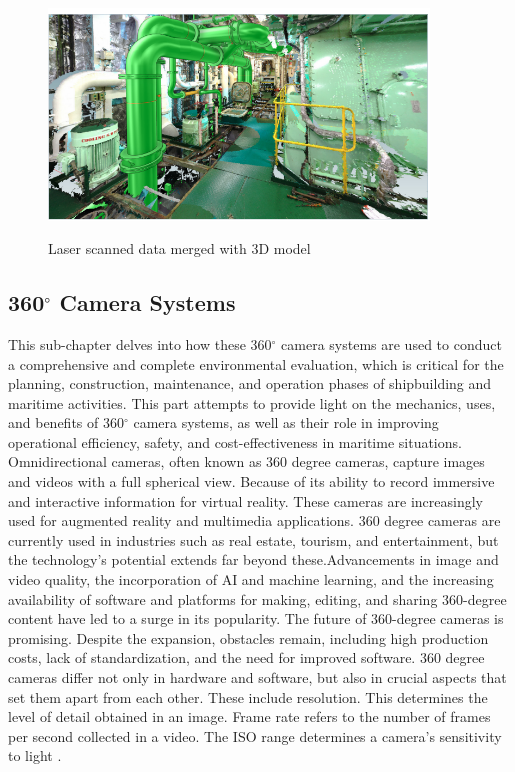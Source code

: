 \begin{figure}[H]
  \centering
  \includegraphics[width=0.9\textwidth]{Figures/AVEVAE3D.PNG}
  \caption[laser data integrated with 3D CAD model in AVEVA E3D software]{Laser scanned data merged with 3D model} \cite{AVEVAE3D}
  \label{fig:Laser data merge with 3D}
\end{figure}

\subsection{360$^{\circ}$ Camera Systems}
 This sub-chapter delves into how these 360$^{\circ}$ camera systems are used to conduct a comprehensive and complete environmental evaluation, which is critical for the planning, construction, maintenance, and operation phases of shipbuilding and maritime activities. This part attempts to provide light on the mechanics, uses, and benefits of 360$^{\circ}$ camera systems, as well as their role in improving operational efficiency, safety, and cost-effectiveness in maritime situations.
Omnidirectional cameras, often known as 360 degree cameras, capture images and videos with a full spherical view. Because of its ability to record immersive and interactive information for virtual reality. 
These cameras are increasingly used for augmented reality and multimedia applications. 360 degree cameras are currently used in industries such as real estate, tourism, and entertainment, but the technology's potential extends far beyond these.Advancements in image and video quality, the incorporation of AI and machine learning, and the increasing availability of software and platforms for making, editing, and sharing 360-degree content have led to a surge in its popularity. The future of 360-degree cameras is promising. Despite the expansion, obstacles remain, including high production costs, lack of standardization, and the need for improved software. 360 degree cameras differ not only in hardware and software, but also in crucial aspects that set them apart from each other. These include resolution. This determines the level of detail obtained in an image. Frame rate refers to the number of frames per second collected in a video. The ISO range determines a camera's sensitivity to light
 \cite{karkhanis2023complete}.

